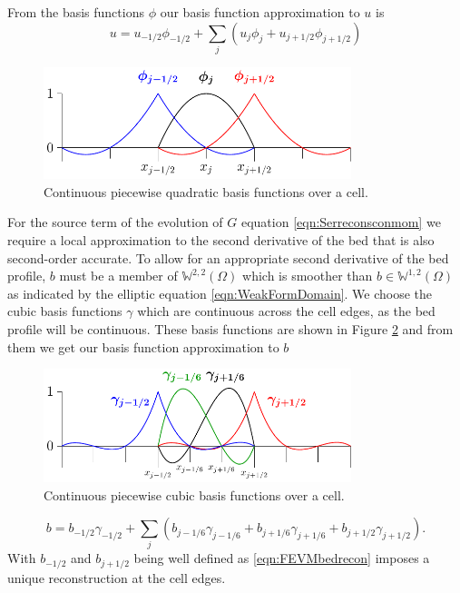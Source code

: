 From the basis functions $\phi$ our basis function approximation to $u$ is
\begin{equation}
u = u_{-1/2}\phi_{-1/2} + \sum_j \left( u_{j}\phi_{j} + u_{j+1/2}\phi_{j+1/2} \right)
\label{eqn:FEapproxtou}
\end{equation}

\begin{figure}
	\centering
	\includegraphics[width=0.8\textwidth]{./chp3/figures/P2.pdf}
	\caption{Continuous piecewise quadratic basis functions over a cell.}
	\label{fig:P2ContBasis}
\end{figure}

For the source term of the evolution of $G$ equation \eqref{eqn:Serreconsconmom} we require a local approximation to the second derivative of the bed that is also second-order accurate. To allow for an appropriate second derivative of the bed profile, $b$ must be a member of $\mathbb{W}^{2,2}(\Omega)$ which is smoother than $b \in \mathbb{W}^{1,2}(\Omega)$ as indicated by the elliptic equation \eqref{eqn:WeakFormDomain}. We choose the cubic basis functions $\gamma$ which are continuous across the cell edges, as the bed profile will be continuous. These basis functions are shown in Figure \ref{fig:P3ContBasis} and from them we get our basis function approximation to $b$
\begin{figure}
	\centering
	\includegraphics[width=0.8\textwidth]{./chp3/figures/P3.pdf}
	\caption{Continuous piecewise cubic basis functions over a cell.}
	\label{fig:P3ContBasis}
\end{figure}
\begin{equation}
b = b_{-1/2}\gamma_{-1/2} +  \sum_j \left(b_{j-1/6}\gamma_{j-1/6}  + b_{j+1/6}\gamma_{j+1/6} + b_{j+1/2}\gamma_{j+1/2} \right).
\label{eqn:FEapproxtob}
\end{equation}
With $b_{-1/2}$ and $b_{j+1/2}$ being well defined as \eqref{eqn:FEVMbedrecon} imposes a unique reconstruction at the cell edges. 

